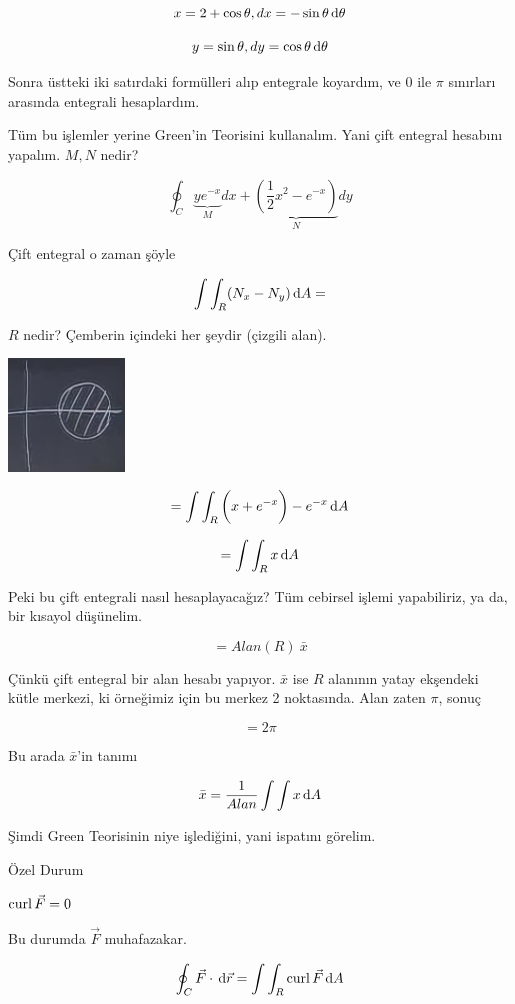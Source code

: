 \documentclass[12pt,fleqn]{article}\usepackage{../../common}
\begin{document}
$$ x = 2 + \cos\theta, dx = -\sin\theta \,\mathrm{d}\theta $$

$$ y = \sin\theta, dy = \cos\theta \,\mathrm{d}\theta $$

Sonra üstteki iki satırdaki formülleri alıp entegrale koyardım, ve 0 ile
$\pi$ sınırları arasında entegrali hesaplardım. 

Tüm bu işlemler yerine Green'in Teorisini kullanalım. Yani çift entegral
hesabını yapalım. $M,N$ nedir? 

$$ \oint_C 
\underbrace{ye^{-x}}_{M} dx + 
\underbrace{(\frac{1}{2}x^2 - e^{-x})}_{N}dy
$$

Çift entegral o zaman şöyle

$$ \int \int_R (N_x - N_y) \,\mathrm{d} A = $$

$R$ nedir? Çemberin içindeki her şeydir (çizgili alan). 

\begin{center}
\includegraphics[height=3cm]{22_2.png}
\end{center}

$$= \int \int_R \bigg( x+ e^{-x} \bigg) - e^{-x} \,\mathrm{d} A $$

$$=  \int \int_R  x \,\mathrm{d} A $$

Peki bu çift entegrali nasıl hesaplayacağız? Tüm cebirsel işlemi
yapabiliriz, ya da, bir kısayol düşünelim. 

$$ = Alan(R) \ \bar{x} $$

Çünkü çift entegral bir alan hesabı yapıyor. $\bar{x}$ ise $R$ alanının
yatay ekşendeki kütle merkezi, ki örneğimiz için bu merkez 2
noktasında. Alan zaten $\pi$, sonuç

$$ = 2\pi $$

Bu arada $\bar{x}$'in tanımı

$$ \bar{x} = \frac{1}{Alan} \int \int x \,\mathrm{d} A $$


Şimdi Green Teorisinin niye işlediğini, yani ispatını görelim. 

Özel Durum 

$\operatorname{curl} \vec{F} = 0$

Bu durumda $\vec{F}$ muhafazakar. 

$$ \oint_C \vec{F} \cdot \,\mathrm{d}\vec{r} = \int \int_R \operatorname{curl} \vec{F} \,\mathrm{d} A $$
\end{document}
